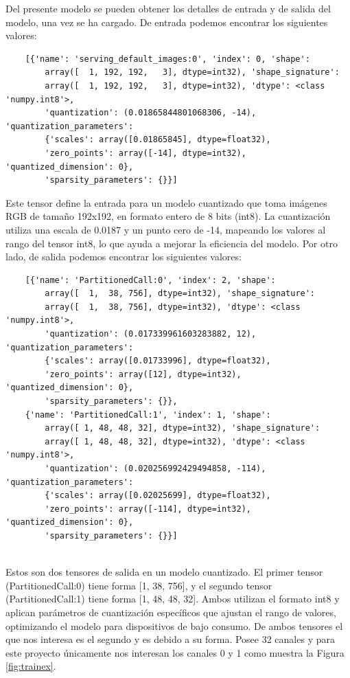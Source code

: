 Del presente modelo se pueden obtener los detalles de entrada y de salida del modelo, una vez se ha cargado. De entrada podemos encontrar los siguientes valores: 

\begin{verbatim}
	[{'name': 'serving_default_images:0', 'index': 0, 'shape': 
		array([  1, 192, 192,   3], dtype=int32), 'shape_signature': 
		array([  1, 192, 192,   3], dtype=int32), 'dtype': <class 'numpy.int8'>, 
		'quantization': (0.01865844801068306, -14), 'quantization_parameters': 
		{'scales': array([0.01865845], dtype=float32), 
		'zero_points': array([-14], dtype=int32), 'quantized_dimension': 0}, 
		'sparsity_parameters': {}}]
\end{verbatim}

Este tensor define la entrada para un modelo cuantizado que toma imágenes RGB de tamaño 192x192, en formato entero de 8 bits (int8). La cuantización utiliza una escala de 0.0187 y un punto cero de -14, mapeando los valores al rango del tensor int8, lo que ayuda a mejorar la eficiencia del modelo. Por otro lado, de salida podemos encontrar los siguientes valores: 

\begin{verbatim}
	[{'name': 'PartitionedCall:0', 'index': 2, 'shape': 
		array([  1,  38, 756], dtype=int32), 'shape_signature': 
		array([  1,  38, 756], dtype=int32), 'dtype': <class 'numpy.int8'>,
		'quantization': (0.017339961603283882, 12), 'quantization_parameters':
		{'scales': array([0.01733996], dtype=float32), 
		'zero_points': array([12], dtype=int32), 'quantized_dimension': 0},
	  	'sparsity_parameters': {}},
	{'name': 'PartitionedCall:1', 'index': 1, 'shape': 
		array([ 1, 48, 48, 32], dtype=int32), 'shape_signature': 
		array([ 1, 48, 48, 32], dtype=int32), 'dtype': <class 'numpy.int8'>, 
		'quantization': (0.020256992429494858, -114), 'quantization_parameters': 
		{'scales': array([0.02025699], dtype=float32), 
		'zero_points': array([-114], dtype=int32), 'quantized_dimension': 0},
		'sparsity_parameters': {}}]
		
\end{verbatim}


Estos son dos tensores de salida en un modelo cuantizado. El primer tensor (PartitionedCall:0) tiene forma [1, 38, 756], y el segundo tensor (PartitionedCall:1) tiene forma [1, 48, 48, 32]. Ambos utilizan el formato int8 y aplican parámetros de cuantización específicos que ajustan el rango de valores, optimizando el modelo para dispositivos de bajo consumo. De ambos tensores el que nos interesa es el segundo y es debido a su forma. Posee 32 canales y para este proyecto únicamente nos interesan los canales 0 y 1 como muestra la Figura \ref{fig:trainex}.

